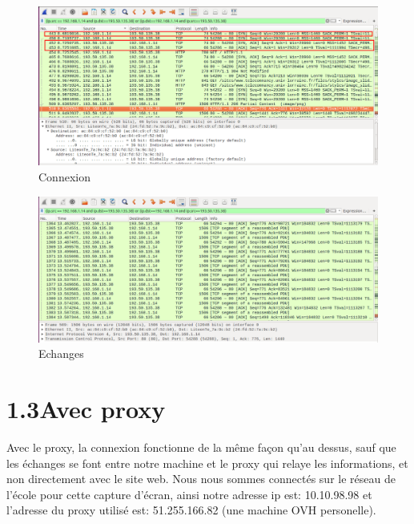 \documentclass[12pt, a4paper]{report}
\begin{document}
\begin{figure}[p]
   \caption{\label{étiquette} Connexion}
   \includegraphics[scale=0.35]{../images/Connexion.png}
\end{figure}

\begin{figure}[p]
   \caption{\label{étiquette} Echanges}
   \includegraphics[scale=0.35]{../images/Echange.png}
\end{figure}


\newpage

\section*{\hspace{0.6cm}1.3\hspace{0.6cm}Avec proxy}

\hspace{1cm}Avec le proxy, la connexion fonctionne de la même façon qu'au dessus, sauf que les échanges se font entre notre machine et le proxy qui relaye les informations, et non directement avec le site web. Nous nous sommes connectés sur le réseau de l'école pour cette capture d'écran, ainsi notre adresse ip est: 10.10.98.98 et l'adresse du proxy utilisé est: 51.255.166.82 (une machine OVH personelle).\\
\end{document}
